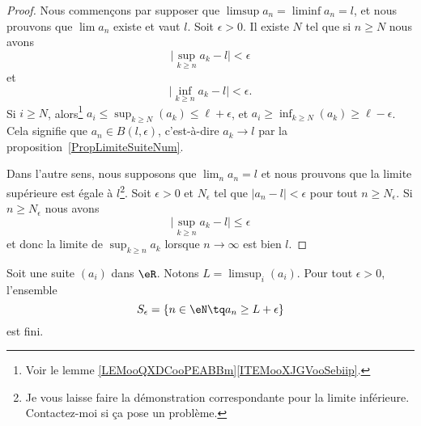 \begin{proof}
	Nous commençons par supposer que \( \limsup a_n=\liminf a_n=l\), et nous prouvons que \( \lim a_n\) existe et vaut \( l\). Soit \( \epsilon>0\). Il existe \( N\) tel que si \( n\geq N\) nous avons
	\begin{equation}
		\big| \sup_{k\geq n}a_k-l \big|<\epsilon
	\end{equation}
	et
	\begin{equation}
		\big| \inf_{k\geq n}a_k-l \big|<\epsilon.
	\end{equation}
	Si \( i\geq N\), alors\footnote{Voir le lemme \ref{LEMooQXDCooPEABBm}\ref{ITEMooXJGVooSebiip}.} \( a_i\leq \sup_{k\geq N}(a_k)\leq \ell+\epsilon\), et \( a_i\geq\inf_{k\geq N}(a_k)\geq \ell-\epsilon\). Cela signifie que \( a_n\in B(l,\epsilon)\), c'est-à-dire \( a_k\to l\) par la proposition~\ref{PropLimiteSuiteNum}.

	Dans l'autre sens, nous supposons que \( \lim_n a_n=l\) et nous prouvons que la limite supérieure est égale à \( l\)\footnote{Je vous laisse faire la démonstration correspondante pour la limite inférieure. Contactez-moi si ça pose un problème.}. Soit \( \epsilon>0\) et \( N_{\epsilon}\) tel que \( | a_n-l |<\epsilon\) pour tout \( n\geq N_{\epsilon}\). Si \( n\geq N_{\epsilon}\) nous avons
	\begin{equation}
		\big| \sup_{k\geq n}a_k-l \big|\leq \epsilon
	\end{equation}
	et donc la limite de \( \sup_{k\geq n}a_k\) lorsque \( n\to \infty\) est bien \(l\).
\end{proof}

\begin{lemma}       \label{LEMooHGJVooCbgOEK}
	Soit une suite \( (a_i)\) dans \( \eR\). Notons \( L= \limsup_i(a_i)\).
	Pour tout \( \epsilon>0\), l'ensemble
	\begin{equation}
		S_{\epsilon}=\{ n\in \eN\tq a_n\geq L+\epsilon \}
	\end{equation}
	est fini.
\end{lemma}

